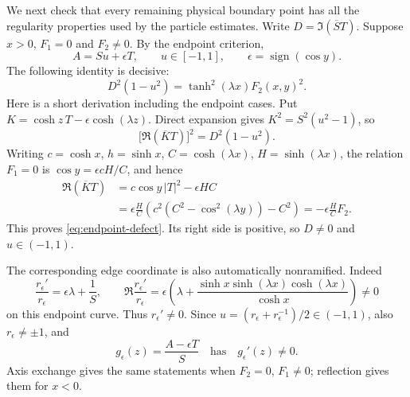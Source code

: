 \documentclass[11pt]{article}
\numberwithin{equation}{section}
\theoremstyle{definition}
\begin{document}
We next check that every remaining physical boundary point has all
the regularity properties used by the particle estimates.
Write $D=\Im(\overline S T)$.
Suppose $x>0$, $F_1=0$ and $F_2\ne0$.  By the endpoint criterion,
\begin{equation}\label{eq:endpointrepresentation}
 A=Su+\epsilon T,\qquad
 u\in[-1,1],\qquad \epsilon=\operatorname{sign}(\cos y).
\end{equation}
The following identity is decisive:
\begin{equation}\label{eq:endpoint-defect}
 D^2(1-u^2)=\tanh^2(\lambda x)F_2(x,y)^2.
\end{equation}
Here is a short derivation including the endpoint cases.
Put $K=\cosh z\,T-\epsilon\cosh(\lambda z)$.
Direct expansion gives $K^2=S^2(u^2-1)$, so
\[
 \bigl[\Re(\overline K T)\bigr]^2=D^2(1-u^2).
\]
Writing $c=\cosh x$, $h=\sinh x$,
$C=\cosh(\lambda x)$, $H=\sinh(\lambda x)$,
the relation $F_1=0$ is $\cos y=\epsilon cH/C$, and hence
\begin{align*}
 \Re(\overline K T)
 &=c\cos y\,|T|^2-\epsilon HC\\
 &=\epsilon\frac HC\left(c^2(C^2-\cos^2(\lambda y))-C^2\right)
 =-\epsilon\frac HC F_2.
\end{align*}
This proves \eqref{eq:endpoint-defect}.  Its right side is positive,
so $D\ne0$ and $u\in(-1,1)$.

The corresponding edge coordinate is also automatically nonramified.
Indeed
\[
 \frac{r_\epsilon'}{r_\epsilon}=\epsilon\lambda+\frac1S,
 \qquad
 \Re\frac{r_\epsilon'}{r_\epsilon}
     =\epsilon\left(\lambda+
        \frac{\sinh x\sinh(\lambda x)\cosh(\lambda x)}{\cosh x}\right)
     \ne0
\]
on this endpoint curve.  Thus $r_\epsilon'\ne0$.
Since $u=(r_\epsilon+r_\epsilon^{-1})/2\in(-1,1)$,
also $r_\epsilon\ne\pm1$, and
\[
 g_\epsilon(z)=\frac{A-\epsilon T}{S}
 \quad\text{has}\quad g_\epsilon'(z)\ne0.
\]
Axis exchange gives the same statements when $F_2=0$, $F_1\ne0$;
reflection gives them for $x<0$.
\end{document}

